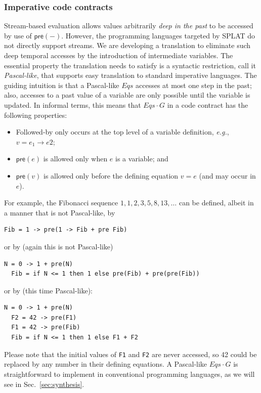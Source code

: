 \documentclass[global,twocolumn]{svjour}
\newcommand{\konst}[1]{\ensuremath{\mathsf{#1}}}
\newcommand{\Eqs}{\ensuremath{\mathit{Eqs}}}
\newcommand{\secref}[1]{Sec.~\ref{#1}}
\newcommand{\eg}{\textit{e.g.}}
\begin{document}

\subsubsection*{Imperative code contracts}

Stream-based evaluation allows values arbitrarily \emph{deep in the past} to be accessed by use of $\konst{pre}(-)$.
%
However, the programming languages targeted by SPLAT do not directly support streams.
%
We are developing a translation to eliminate such deep temporal accesses by the introduction of intermediate variables.
%
The essential property the translation needs to satisfy is a syntactic restriction, call it \emph{Pascal-like}, that supports easy translation to standard imperative languages.
%
The guiding intuition is that a Pascal-like {\Eqs} accesses at most one step in the past;
%
also, accesses to a past value of a variable are only possible until the variable is updated.
%
In informal terms, this means that ${\Eqs}\cdot G$ in a code contract has the following properties:
%
\begin{itemize}
\item Followed-by only occurs at the top level of a variable definition, \eg, $v = e_1 \to e2$;
\item $\konst{pre}(e)$ is allowed only when $e$ is a variable; and
\item $\konst{pre}(v)$ is allowed only before the defining equation $v = e$ (and may occur in $e$).
\end{itemize}
%
For example, the Fibonacci sequence $1,1,2,3,5,8,13,\ldots$ can be defined, albeit in a manner that is not Pascal-like, by
%
{\small
\begin{lstlisting}[style=agree]
  Fib = 1 -> pre(1 -> Fib + pre Fib)
\end{lstlisting}
}
%
\noindent or by (again this is not Pascal-like)
%
{\small
\begin{lstlisting}[style=agree]
  N = 0 -> 1 + pre(N)
  Fib = if N <= 1 then 1 else pre(Fib) + pre(pre(Fib))
\end{lstlisting}
}
%
\noindent or by (this time Pascal-like):
%
{\small
\begin{lstlisting}[style=agree]
  N = 0 -> 1 + pre(N)
  F2 = 42 -> pre(F1)
  F1 = 42 -> pre(Fib)
  Fib = if N <= 1 then 1 else F1 + F2
\end{lstlisting}
}
%
Please note that the initial values of \verb+F1+ and \verb+F2+ are never accessed, so 42 could be replaced by any number in their defining equations.
%
A Pascal-like ${\Eqs} \cdot G$ is straightforward to implement in conventional programming languages, as we will see in \secref{sec:synthesis}.
\end{document}
